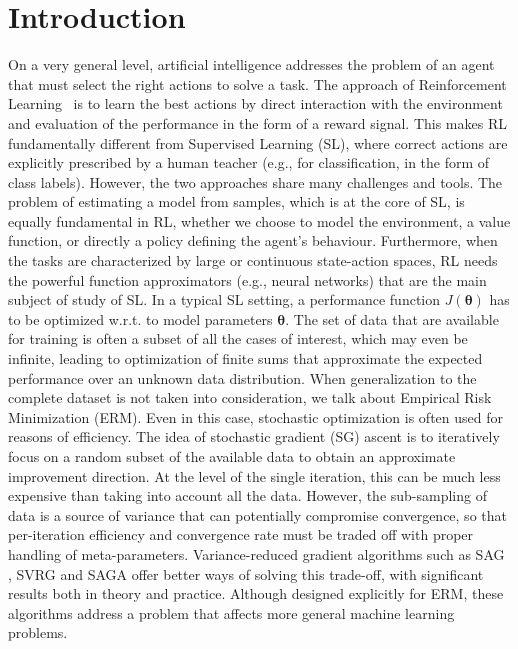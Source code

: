 \documentclass{article}
\makeatletter
\theoremstyle{remark}
\theoremstyle{definition}
\DeclareRobustCommand{\eg}{e.g.,\@\xspace}
\DeclareRobustCommand{\wrt}{w.r.t.\@\xspace}
\newcommand{\vtheta}{\boldsymbol{\theta}}
\makeatother
\begin{document}
\section{Introduction}
On a very general level, artificial intelligence addresses the problem of an agent that must select the right actions to solve a task. The approach of Reinforcement Learning~\citep{sutton1998reinforcement} is to learn the best actions by direct interaction with the environment and evaluation of the performance in the form of a reward signal. This makes RL fundamentally different from Supervised Learning (SL), where correct actions are explicitly prescribed by a human teacher (\eg for classification, in the form of class labels). However, the two approaches share many challenges and tools. The problem of estimating a model from samples, which is at the core of SL, is equally fundamental in RL, whether we choose to model the environment, a value function, or directly a policy defining the agent's behaviour. Furthermore, when the tasks are characterized by large or continuous state-action spaces, RL needs the powerful function approximators (\eg neural networks) that are the main subject of study of SL.
In a typical SL setting, a performance function $J(\vtheta)$ has to be optimized \wrt to model parameters $\vtheta$. The set of data that are available for training is often a subset of all the cases of interest, which may even be infinite, leading to optimization of finite sums that approximate the expected performance over an unknown data distribution. When generalization to the complete dataset is not taken into consideration, we talk about Empirical Risk Minimization (ERM). Even in this case, stochastic optimization is often used for reasons of efficiency. The idea of stochastic gradient (SG) ascent \cite{nesterov2013introductory} is to iteratively focus on a random subset of the available data to obtain an approximate improvement direction. At the level of the single iteration, this can be much less expensive than taking into account all the data. However, the sub-sampling of data is a source of variance that can potentially compromise convergence, so that per-iteration efficiency and convergence rate must be traded off with proper handling of meta-parameters.
Variance-reduced gradient algorithms such as SAG \cite{roux2012stochastic}, SVRG \cite{johnson2013accelerating} and SAGA \cite{defazio2014saga} offer better ways of solving this trade-off, with significant results both in theory and practice. Although designed explicitly for ERM, these algorithms address a problem that affects more general machine learning problems. 
\end{document}
